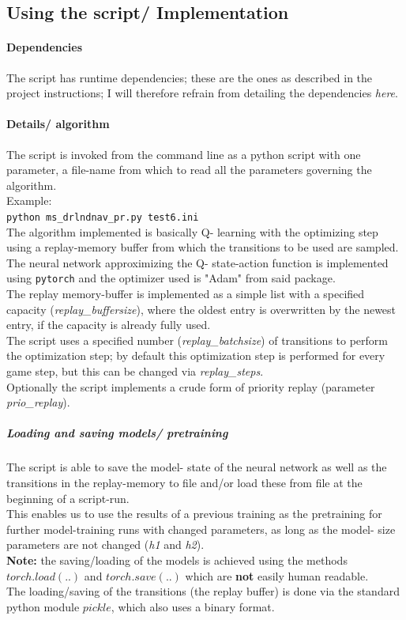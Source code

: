 \documentclass{article}
\begin{document}
\subsection{Using the script/ Implementation}
\paragraph{Dependencies}
The script has runtime dependencies; these are the ones as described in the
project instructions; I will therefore refrain from detailing the dependencies \textit{here}.

\paragraph{Details/ algorithm}
The script is invoked from the command line as a python script with one parameter,
a file-name from which to read all the parameters governing the algorithm.
\\
Example:\\
\texttt{python ms\_drlndnav\_pr.py test6.ini}
\\
The algorithm implemented is basically Q- learning with the optimizing step
using a replay-memory buffer from which the transitions to be used are sampled.
The neural network approximizing the Q- state-action function is implemented
using \texttt{pytorch} and the optimizer used is "Adam" from said package.
\\
The replay memory-buffer is implemented as a simple list with a specified capacity (\textit{replay\_buffersize}),
where the oldest entry is overwritten by the newest entry, if the capacity is already
fully used.
\\
The script uses a specified number (\textit{replay\_batchsize}) of transitions
to perform the optimization step; by default this optimization step is performed
for every game step, but this can be changed via \textit{replay\_steps}.
\\
Optionally the script implements a crude form of priority replay (parameter \textit{prio\_replay}).

\subparagraph{Loading and saving models/ pretraining}
The script is able to save the model- state of the neural network as well as
the transitions in the replay-memory to file and/or load these from file
at the beginning of a script-run.
\\
This enables us to use the results of a previous training as the pretraining
for further model-training runs with changed parameters, as long as the model-
size parameters are not changed (\textit{h1} and \textit{h2}).
\\
\textbf{Note:} the saving/loading of the models is achieved using the methods
$torch.load(..)$ and $torch.save(..)$ which are \textbf{not} easily human readable.\\
The loading/saving of the transitions (the replay buffer) is done via
the standard python module $pickle$, which also uses a binary format. 
\end{document}

